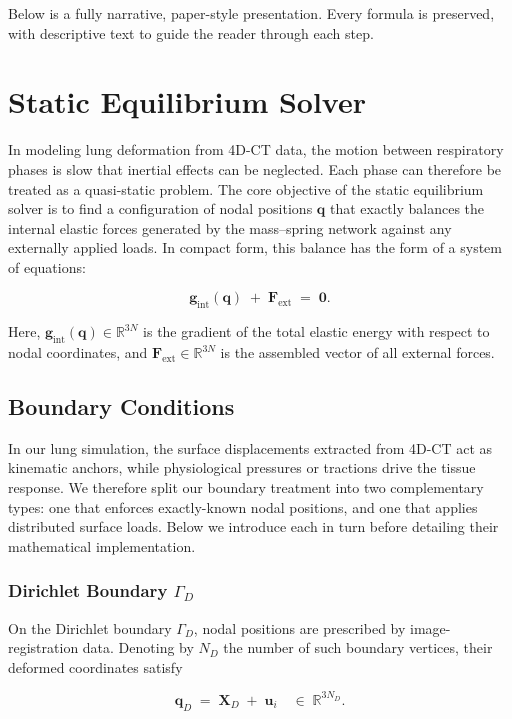 \documentclass{article}
\begin{document}
Below is a fully narrative, paper-style presentation. Every formula is preserved, with descriptive text to guide the reader through each step.



\section{Static Equilibrium Solver}

In modeling lung deformation from 4D-CT data, the motion between respiratory phases is slow that inertial effects can be neglected. 
Each phase can therefore be treated as a quasi-static problem. 
The core objective of the static equilibrium solver is to 
find a configuration of nodal positions $\mathbf q$ that exactly balances 
the internal elastic forces generated by the mass–spring network against any externally applied loads. In compact form, this balance has the form of a system of equations:

$$
  \mathbf g_{\mathrm{int}}(\mathbf q)\;+\;\mathbf F_{\mathrm{ext}}\;=\;\mathbf 0.
$$

Here, $\mathbf g_{\mathrm{int}}(\mathbf q)\in\mathbb R^{3N}$ is the gradient of the total elastic energy with respect to nodal coordinates, and $\mathbf F_{\mathrm{ext}}\in\mathbb R^{3N}$ is the assembled vector of all external forces.



\subsection{Boundary Conditions}
In our lung simulation, the surface displacements extracted from 4D-CT act as kinematic anchors, 
while physiological pressures or tractions drive the tissue response. 
We therefore split our boundary treatment into two complementary types: one that enforces exactly-known nodal positions, 
and one that applies distributed surface loads. Below we introduce each in turn before detailing their mathematical implementation.
\subsubsection{Dirichlet Boundary $\Gamma_D$}

On the Dirichlet boundary $\Gamma_D$, nodal positions are prescribed by image-registration data. 
Denoting by $N_D$ the number of such boundary vertices, their deformed coordinates satisfy

$$
  \mathbf q_D \;=\;\mathbf X_D\;+\;\mathbf u_i
  \quad\in\;\mathbb R^{3N_D}.
$$
\end{document}
